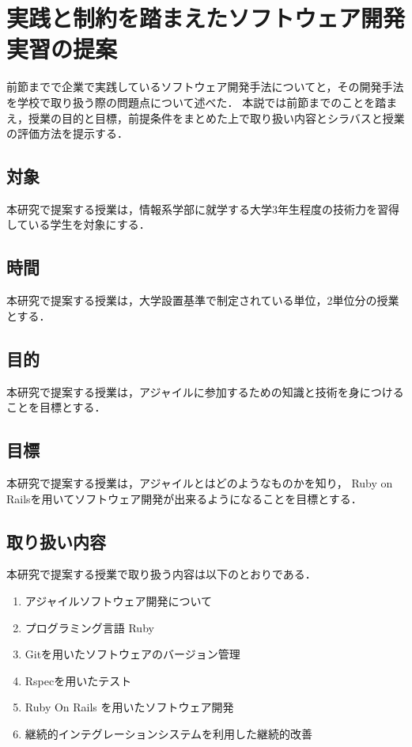 \section{実践と制約を踏まえたソフトウェア開発実習の提案}

前節までで企業で実践しているソフトウェア開発手法についてと，その開発手法を学校で取り扱う際の問題点について述べた．
本説では前節までのことを踏まえ，授業の目的と目標，前提条件をまとめた上で取り扱い内容とシラバスと授業の評価方法を提示する．

\subsection{対象}

本研究で提案する授業は，情報系学部に就学する大学3年生程度の技術力を習得している学生を対象にする．

\subsection{時間}

本研究で提案する授業は，大学設置基準\cite{univ_criteria}で制定されている単位，2単位分の授業とする．

\subsection{目的}

本研究で提案する授業は，アジャイルに参加するための知識と技術を身につけることを目標とする．

\subsection{目標}

本研究で提案する授業は，アジャイルとはどのようなものかを知り， Ruby on Railsを用いてソフトウェア開発が出来るようになることを目標とする．

\subsection{取り扱い内容
  \label{tech-content}
}

本研究で提案する授業で取り扱う内容は以下のとおりである．

\begin{enumerate}
  \item アジャイルソフトウェア開発について
  \item プログラミング言語 Ruby
  \item Gitを用いたソフトウェアのバージョン管理
  \item Rspecを用いたテスト
  \item Ruby On Rails を用いたソフトウェア開発
  \item 継続的インテグレーションシステムを利用した継続的改善
\end{enumerate}

